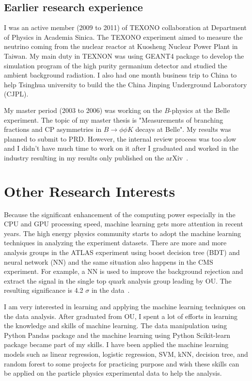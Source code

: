 \documentclass[12pt]{article}
\begin{document}
\subsection{Earlier research experience}
I was an active member (2009 to 2011) of TEXONO collaboration at Department of Physics in Academia Sinica.
The TEXONO experiment aimed to measure the neutrino coming from the nuclear reactor at Kuosheng Nuclear Power Plant in Taiwan.
My main duty in TEXNON was using GEANT4 package to develop the simulation program of the high purity germanium detector and studied the ambient background radiation.
I also had one month business trip to China to help Tsinghua university to build the the China Jinping Underground Laboratory (CJPL).

My master period (2003 to 2006) was working on the $B$-physics at the Belle experiment.
The topic of my master thesis is "Measurements of branching fractions and CP asymmetries in $B \to \phi \phi K$ decays at Belle". 
My results was planned to submit to PRD.
However, the internal review process was too slow and I didn't have much time to work on it after I graduated and worked in the industry resulting in my results only published on the arXiv~\cite{Abe:2006qy, Shen:2008pr}.


\section{Other Research Interests}
Because the significant enhancement of the computing power especially in the CPU and GPU processing speed, machine learning gets more attention in recent years. 
The high energy physics community starts to adopt the machine learning techniques in analyzing the experiment datasets.
There are more and more analysis groups in the ATLAS experiment using boost decision tree (BDT) and neural network (NN) and the same situation also happens in the CMS experiment.
For example, a NN is used to improve the background rejection and extract the signal in the single top quark analysis group leading by OU. The resulting significance is 4.2 $\sigma$ in the data~\cite{Aaboud:2017ylb}.

I am very interested in learning and applying the machine learning techniques on the  data analysis.
After graduated from OU, I spent a lot of efforts in learning the knowledge and skills of  machine learning.
The data manipulation using Python Pandas package and the machine learning using Python Scikit-learn package became part of my skills.
I have been applied the machine learning models such as linear regression, logistic regression, SVM, kNN, decision tree, and random forest to some projects for practicing purpose and wish these skills can be applied on the particle physics experimental data to help the analysis.
\end{document}
